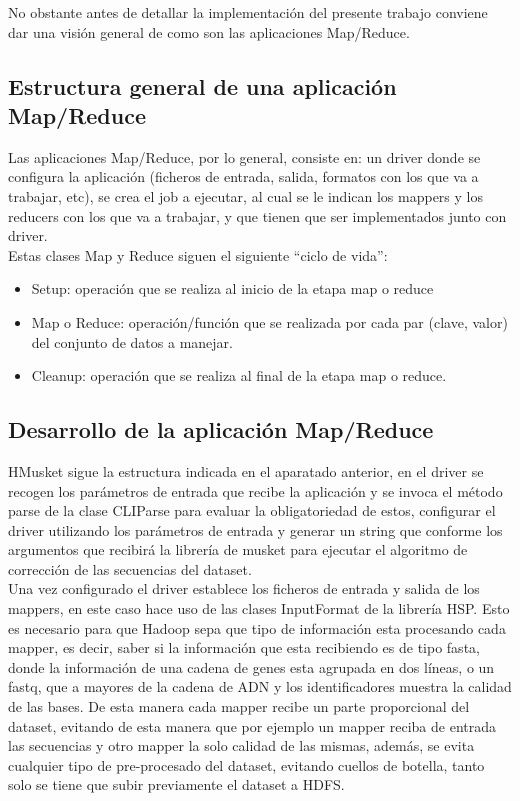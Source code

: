 \documentclass[conference]{IEEEtran}
\begin{document}
No obstante antes de detallar la implementación del presente trabajo conviene dar una visión general de como son las aplicaciones Map/Reduce.

\subsection{Estructura general de una aplicación Map/Reduce}
Las aplicaciones Map/Reduce, por lo general, consiste en: un driver donde se configura la aplicación (ficheros de entrada, salida, formatos con los que va a trabajar, etc), se crea el job a ejecutar, al cual se le indican los mappers y los reducers con los que va a trabajar, y que tienen que ser implementados junto con driver.\\
Estas clases Map y Reduce siguen el siguiente ``ciclo de vida'':

\begin{itemize}
	\item Setup: operación que se realiza al inicio de la etapa map o reduce
	\item Map o Reduce: operación/función que se realizada por cada par (clave, valor) del conjunto de datos a manejar.
	\item Cleanup: operación que se realiza al final de la etapa map o reduce.
\end{itemize}

\subsection{Desarrollo de la aplicación Map/Reduce}
HMusket sigue la estructura indicada en el aparatado anterior, en el driver se recogen los parámetros de entrada que recibe la aplicación y se invoca el método parse de la clase CLIParse para evaluar la obligatoriedad de estos, configurar el driver utilizando los parámetros de entrada y generar un string que conforme los argumentos que recibirá la librería de musket para ejecutar el algoritmo de corrección de las secuencias del dataset.\\
Una vez configurado el driver establece los ficheros de entrada y salida de los mappers, en este caso hace uso de las clases InputFormat de la librería HSP. Esto es necesario para que Hadoop sepa que tipo de información esta procesando cada mapper, es decir, saber si la información que esta recibiendo es de tipo fasta, donde la información de una cadena de genes esta agrupada en dos líneas, o un fastq, que a mayores de la cadena de ADN y los identificadores muestra la calidad de las bases. De esta manera cada mapper recibe un parte proporcional del dataset, evitando de esta manera que por ejemplo un mapper reciba de entrada las secuencias y otro mapper la solo calidad de las mismas, además, se evita cualquier tipo de pre-procesado del dataset, evitando cuellos de botella, tanto solo se tiene que subir previamente el dataset a HDFS.\\
\end{document}
